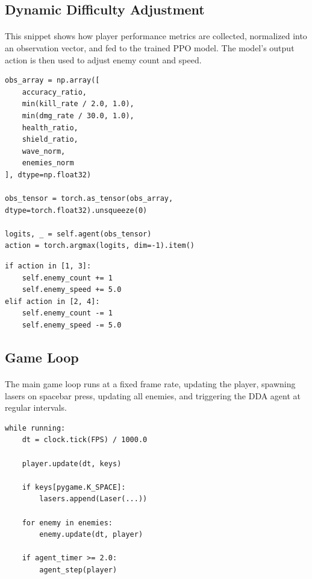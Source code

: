 \subsection{Dynamic Difficulty Adjustment}
\paragraph{} This snippet shows how player performance metrics are collected, normalized into an observation vector, and fed to the trained PPO model. The model's output action is then used to adjust enemy count and speed.

\begin{verbatim}
obs_array = np.array([
    accuracy_ratio,
    min(kill_rate / 2.0, 1.0),
    min(dmg_rate / 30.0, 1.0),
    health_ratio,
    shield_ratio,
    wave_norm,
    enemies_norm
], dtype=np.float32)

obs_tensor = torch.as_tensor(obs_array, dtype=torch.float32).unsqueeze(0)

logits, _ = self.agent(obs_tensor)
action = torch.argmax(logits, dim=-1).item()
\end{verbatim}

\begin{verbatim}
if action in [1, 3]:
    self.enemy_count += 1
    self.enemy_speed += 5.0
elif action in [2, 4]:
    self.enemy_count -= 1
    self.enemy_speed -= 5.0
\end{verbatim}

\subsection{Game Loop}
\paragraph{} The main game loop runs at a fixed frame rate, updating the player, spawning lasers on spacebar press, updating all enemies, and triggering the DDA agent at regular intervals.

\begin{verbatim}
while running:
    dt = clock.tick(FPS) / 1000.0

    player.update(dt, keys)

    if keys[pygame.K_SPACE]:
        lasers.append(Laser(...))

    for enemy in enemies:
        enemy.update(dt, player)

    if agent_timer >= 2.0:
        agent_step(player)
\end{verbatim}
